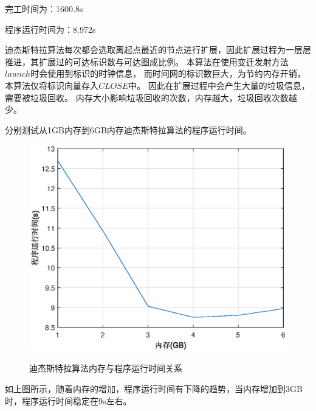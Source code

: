 完工时间为：1600.8s

程序运行时间为：8.972s

迪杰斯特拉算法每次都会选取离起点最近的节点进行扩展，因此扩展过程为一层层推进，其扩展过的可达标识数与可达图成比例。
本算法在使用变迁发射方法$launch$时会使用到标识的时钟信息，
而时间网的标识数巨大，为节约内存开销，本算法仅将标识向量存入$CLOSE$中。
因此在扩展过程中会产生大量的垃圾信息，需要被垃圾回收。
内存大小影响垃圾回收的次数，内存越大，垃圾回收次数越少。

分别测试从1GB内存到6GB内存迪杰斯特拉算法的程序运行时间。

\begin{table}[H]
	\centering
	\caption{内存与程序运行时间关系}
\end{table}

\begin{figure}[H]
	\centering
	\includegraphics[scale=1.00,angle=0]{figures/mem_t.eps}\\
	\caption{迪杰斯特拉算法内存与程序运行时间关系}
\end{figure}

如上图所示，随着内存的增加，程序运行时间有下降的趋势，当内存增加到3GB时，程序运行时间稳定在9s左右。

